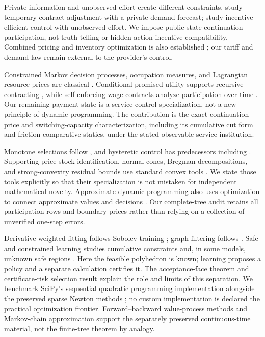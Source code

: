 \documentclass[11pt,letterpaper]{article}
\theoremstyle{definition}
\newcommand{\1}{\mathbf 1}
\begin{document}
Private information and unobserved effort create different constraints. \citet{NasserTurcic2019} study temporary contract adjustment with a private demand forecast; \citet{PlambeckZenios2003} study incentive-efficient control with unobserved effort. We impose public-state continuation participation, not truth telling or hidden-action incentive compatibility. Combined pricing and inventory optimization is also established \citep{FedergruenHeching1999}; our tariff and demand law remain external to the provider's control.

Constrained Markov decision processes, occupation measures, and Lagrangian resource prices are classical \citep{Altman1999}. Conditional promised utility supports recursive contracting \citep{SpearSrivastava1987}, while self-enforcing wage contracts analyze participation over time \citep{ThomasWorrall1988}. Our remaining-payment state is a service-control specialization, not a new principle of dynamic programming. The contribution is the exact continuation-price and switching-capacity characterization, including its cumulative cut form and friction comparative statics, under the stated observable-service institution.

Monotone selections follow \citet{Topkis1978}, and hysteretic control has predecessors including \citet{HippHolzbaur1988}. Supporting-price stock identification, normal cones, Bregman decompositions, and strong-convexity residual bounds use standard convex tools \citep{BoydVandenberghe2004}. We state those tools explicitly so that their specialization is not mistaken for independent mathematical novelty. Approximate dynamic programming also uses optimization to connect approximate values and decisions \citep{DeFariasVanRoy2003}. Our complete-tree audit retains all participation rows and boundary prices rather than relying on a collection of unverified one-step errors.

Derivative-weighted fitting follows Sobolev training \citep{Czarnecki2017}; graph filtering follows \citet{Defferrard2016}. Safe and constrained learning studies cumulative constraints and, in some models, unknown safe regions \citep{Satija2020,WachiSui2020}. Here the feasible polyhedron is known; learning proposes a policy and a separate calculation certifies it. The acceptance-face theorem and certificate-risk selection result explain the role and limits of this separation. We benchmark SciPy's sequential quadratic programming implementation alongside the preserved sparse Newton methods \citep{Virtanen2020}; no custom implementation is declared the practical optimization frontier. Forward--backward value-process methods \citep{MaProtterYong1994,HanJentzenE2018} and Markov-chain approximation \citep{KushnerDupuis2001} support the separately preserved continuous-time material, not the finite-tree theorem by analogy.
\end{document}
